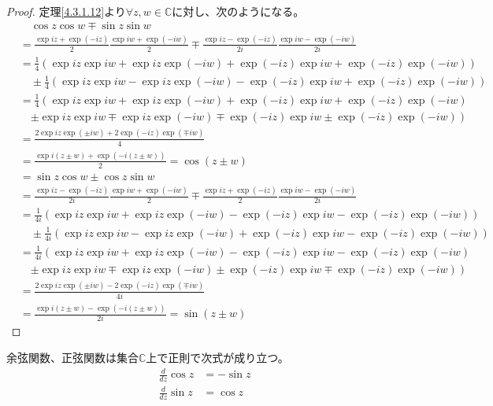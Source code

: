 \documentclass[dvipdfmx]{jsarticle}
\begin{document}
\begin{proof} 定理\ref{4.3.1.12}より$\forall z,w \in \mathbb{C}$に対し、次のようになる。
\begin{align*}
&\quad \cos z\cos w \mp \sin z\sin w\\
&= \frac{\exp{iz} + \exp( - iz)}{2}\frac{\exp{iw} + \exp( - iw)}{2} \mp \frac{\exp{iz} - \exp( - iz)}{2i}\frac{\exp{iw} - \exp( - iw)}{2i}\\
&= \frac{1}{4}\left( \exp{iz}\exp{iw} + \exp{iz}\exp( - iw) + \exp( - iz)\exp{iw} + \exp( - iz)\exp( - iw) \right) \\
&\quad \pm \frac{1}{4}\left( \exp{iz}\exp{iw} - \exp{iz}\exp( - iw) - \exp( - iz)\exp{iw} + \exp( - iz)\exp( - iw) \right)\\
&= \frac{1}{4}\left( \exp{iz}\exp{iw} + \exp{iz}\exp( - iw) + \exp( - iz)\exp{iw} + \exp( - iz)\exp( - iw) \right. \\
&\quad \left. \pm \exp{iz}\exp{iw} \mp \exp{iz}\exp( - iw) \mp \exp( - iz)\exp{iw} \pm \exp( - iz)\exp( - iw) \right)\\
&= \frac{2\exp{iz}\exp( \pm iw) + 2\exp( - iz)\exp( \mp iw)}{4}\\
&= \frac{\exp{i(z \pm w)} + \exp\left( - i(z \pm w) \right)}{2} = \cos(z \pm w)\\
&= \sin z\cos w \pm \cos z\sin w\\
&= \frac{\exp{iz} - \exp( - iz)}{2i}\frac{\exp{iw} + \exp( - iw)}{2} \mp \frac{\exp{iz} + \exp( - iz)}{2}\frac{\exp{iw} - \exp( - iw)}{2i}\\
&= \frac{1}{4i}\left( \exp{iz}\exp{iw} + \exp{iz}\exp( - iw) - \exp( - iz)\exp{iw} - \exp( - iz)\exp( - iw) \right) \\
&\quad \pm \frac{1}{4i}\left( \exp{iz}\exp{iw} - \exp{iz}\exp( - iw) + \exp( - iz)\exp{iw} - \exp( - iz)\exp( - iw) \right)\\
&= \frac{1}{4i}\left( \exp{iz}\exp{iw} + \exp{iz}\exp( - iw) - \exp( - iz)\exp{iw} - \exp( - iz)\exp( - iw) \right. \\
&\quad \left. \pm \exp{iz}\exp{iw} \mp \exp{iz}\exp( - iw) \pm \exp( - iz)\exp{iw} \mp \exp( - iz)\exp( - iw) \right)\\
&= \frac{2\exp{iz}\exp( \pm iw) - 2\exp( - iz)\exp( \mp iw)}{4i}\\
&= \frac{\exp{i(z \pm w)} - \exp\left( - i(z \pm w) \right)}{2i} = \sin(z \pm w)
\end{align*}
\end{proof}
\begin{thm}\label{4.3.1.17}
余弦関数、正弦関数は集合$\mathbb{C}$上で正則で次式が成り立つ。
\begin{align*}
\frac{d}{dz}\cos z &= - \sin z\\
\frac{d}{dz}\sin z &= \cos z
\end{align*}
\end{thm}
\end{document}
